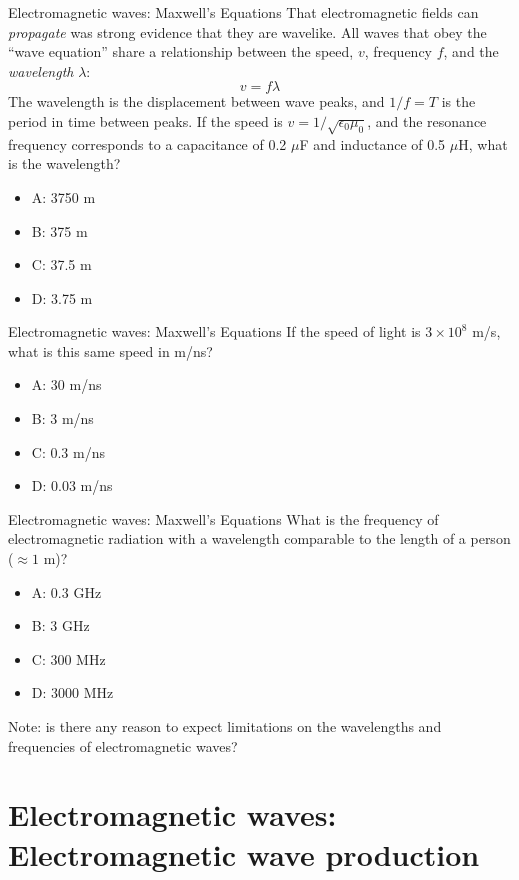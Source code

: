 \documentclass{beamer}
\begin{document}
\begin{frame}{Electromagnetic waves: Maxwell's Equations}
\small
That electromagnetic fields can \textit{propagate} was strong evidence that they are wavelike.  All waves that obey the ``wave equation'' share a relationship between the speed, $v$, frequency $f$, and the \textit{wavelength} $\lambda$:
\begin{equation}
v = f\lambda
\end{equation}
The wavelength is the displacement between wave peaks, and $1/f = T$ is the period in time between peaks.  If the speed is $v = 1/\sqrt{\epsilon_0 \mu_0}$, and the resonance frequency corresponds to a capacitance of 0.2 $\mu$F and inductance of 0.5 $\mu$H, what is the wavelength?
\begin{itemize}
\item A: 3750 m
\item B: 375 m
\item C: 37.5 m
\item D: 3.75 m
\end{itemize}
\end{frame}

\begin{frame}{Electromagnetic waves: Maxwell's Equations}
If the speed of light is $3 \times 10^{8}$ m/s, what is this same speed in m/ns?
\begin{itemize}
\item A: 30 m/ns
\item B: 3 m/ns
\item C: 0.3 m/ns
\item D: 0.03 m/ns
\end{itemize}
\end{frame}

\begin{frame}{Electromagnetic waves: Maxwell's Equations}
What is the frequency of electromagnetic radiation with a wavelength comparable to the length of a person ($\approx 1$ m)?
\begin{itemize}
\item A: 0.3 GHz
\item B: 3 GHz
\item C: 300 MHz
\item D: 3000 MHz
\end{itemize}
\footnotesize
Note: is there any reason to expect limitations on the wavelengths and frequencies of electromagnetic waves?
\end{frame}

\section{Electromagnetic waves: Electromagnetic wave production}
\end{document}
